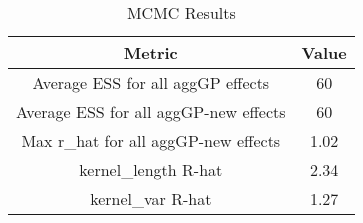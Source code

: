 \documentclass{article}
\begin{document}
\begin{table}[h!]
\centering
\begin{tabular}{|c|c|}
\hline
\textbf{Metric} & \textbf{Value} \\
\hline
Average ESS for all aggGP effects & 60 \\
\hline
Average ESS for all aggGP-new effects & 60 \\
\hline
Max r\_hat for all aggGP-new effects & 1.02 \\
\hline
kernel\_length R-hat & 2.34 \\
\hline
kernel\_var R-hat & 1.27 \\
\hline
\end{tabular}
\caption{MCMC Results}
\label{table:mcmc_results}
\end{table}
\end{document}
